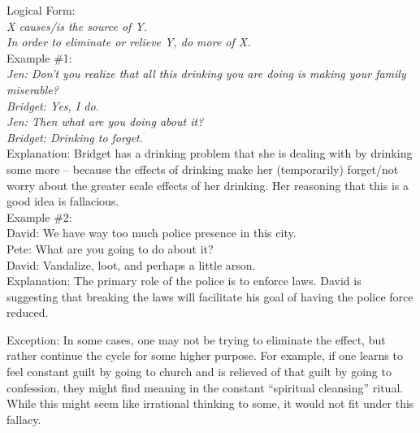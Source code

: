 \documentclass[a4paper,12pt,single,pdftex]{scrartcl}
\begin{document}
    
      Logical Form:
    \\

    
      {\em X causes/is the source of Y.}
    \\

    
      {\em In order to eliminate or relieve Y, do more of X.}
    \\

    
      Example \#1:
    \\

    
      {\em Jen: Don’t you realize that all this drinking you are doing is making your family miserable?}
    \\

    
      {\em Bridget: Yes, I do.}
    \\

    
      {\em Jen: Then what are you doing about it?}
    \\

    
      {\em Bridget: Drinking to forget.}
    \\

    
      Explanation: Bridget has a drinking problem that she is dealing with by drinking some more -- because the effects of drinking make her (temporarily) forget/not worry about the greater scale effects of her drinking.  Her reasoning that this is a good idea is fallacious.
    \\

    
      Example \#2:
    \\

    
      David: We have way too much police presence in this city.
    \\

    
      Pete: What are you going to do about it?
    \\

    
      David: Vandalize, loot, and perhaps a little arson.
    \\

    
      Explanation: The primary role of the police is to enforce laws. David is suggesting that breaking the laws will facilitate his goal of having the police force reduced.
    
    
       \newline

      

      
        Exception: In some cases, one may not be trying to eliminate the effect, but rather continue the cycle for some higher purpose. For example, if one learns to feel constant guilt by going to church and is relieved of that guilt by going to confession, they might find meaning in the constant “spiritual cleansing” ritual. While this might seem like irrational thinking to some, it would not fit under this fallacy.
      \\
\end{document}
